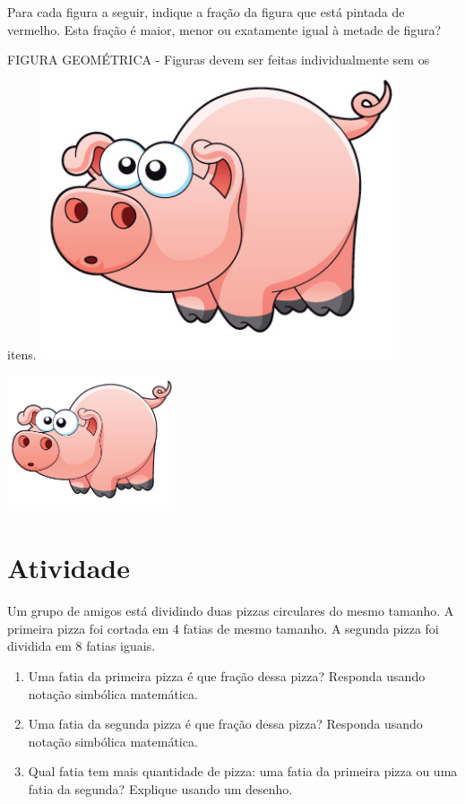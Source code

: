 \documentclass[a4,12pt]{book}
\begin{document}
Para cada figura a seguir, indique a fração da figura que está pintada de vermelho. Esta fração é maior, menor ou exatamente igual à metade de figura?
\begin{imagem*}[breakable]{}{}   FIGURA GEOMÉTRICA - Figuras devem ser feitas individualmente sem os itens.  
    \includegraphics[width=300pt, keepaspectratio]{pig}  
\end{imagem*}






\includegraphics[width=\textwidth,height=4cm, keepaspectratio]{pig}
\section{Atividade}







Um grupo de amigos está dividindo duas pizzas circulares do mesmo tamanho. A primeira pizza foi cortada em 4 fatias de mesmo tamanho. A segunda pizza foi dividida em 8 fatias iguais.

\begin{enumerate} [\quad a)] %
  \item     Uma fatia da primeira pizza é que fração dessa pizza? Responda usando notação simbólica matemática.
  \item     Uma fatia da segunda pizza é que fração dessa pizza? Responda usando notação simbólica matemática.
  \item     Qual fatia tem mais quantidade de pizza: uma fatia da primeira pizza ou uma fatia da segunda? Explique usando um desenho.
\end{enumerate} %
\end{document}
